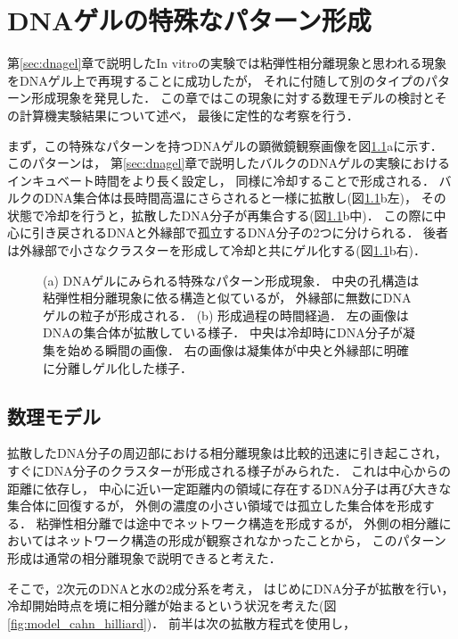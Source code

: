 \chapter{DNAゲルの特殊なパターン形成}

第\ref{sec:dnagel}章で説明したIn vitroの実験では粘弾性相分離現象と思われる現象をDNAゲル上で再現することに成功したが，
それに付随して別のタイプのパターン形成現象を発見した．
この章ではこの現象に対する数理モデルの検討とその計算機実験結果について述べ，
最後に定性的な考察を行う．

まず，この特殊なパターンを持つDNAゲルの顕微鏡観察画像を図\ref{fig:result_special}aに示す．
このパターンは，
第\ref{sec:dnagel}章で説明したバルクのDNAゲルの実験におけるインキュベート時間をより長く設定し，
同様に冷却することで形成される．
バルクのDNA集合体は長時間高温にさらされると一様に拡散し(図\ref{fig:result_special}b左)，
その状態で冷却を行うと，拡散したDNA分子が再集合する(図\ref{fig:result_special}b中)．
この際に中心に引き戻されるDNAと外縁部で孤立するDNA分子の2つに分けられる．
後者は外縁部で小さなクラスターを形成して冷却と共にゲル化する(図\ref{fig:result_special}b右)．

\begin{figure}
\centering

\caption{
    (a) DNAゲルにみられる特殊なパターン形成現象．
        中央の孔構造は粘弾性相分離現象に依る構造と似ているが，
        外縁部に無数にDNAゲルの粒子が形成される．
    (b) 形成過程の時間経過．
        左の画像はDNAの集合体が拡散している様子．
        中央は冷却時にDNA分子が凝集を始める瞬間の画像．
        右の画像は凝集体が中央と外縁部に明確に分離しゲル化した様子．
}
\label{fig:result_special}
\end{figure}

\section{数理モデル}
拡散したDNA分子の周辺部における相分離現象は比較的迅速に引き起こされ，
すぐにDNA分子のクラスターが形成される様子がみられた．
これは中心からの距離に依存し，
中心に近い一定距離内の領域に存在するDNA分子は再び大きな集合体に回復するが，
外側の濃度の小さい領域では孤立した集合体を形成する．
粘弾性相分離では途中でネットワーク構造を形成するが，
外側の相分離においてはネットワーク構造の形成が観察されなかったことから，
このパターン形成は通常の相分離現象で説明できると考えた．

そこで，2次元のDNAと水の2成分系を考え，
はじめにDNA分子が拡散を行い，
冷却開始時点を境に相分離が始まるという状況を考えた(図\ref{fig:model_cahn_hilliard})．
前半は次の拡散方程式を使用し，

